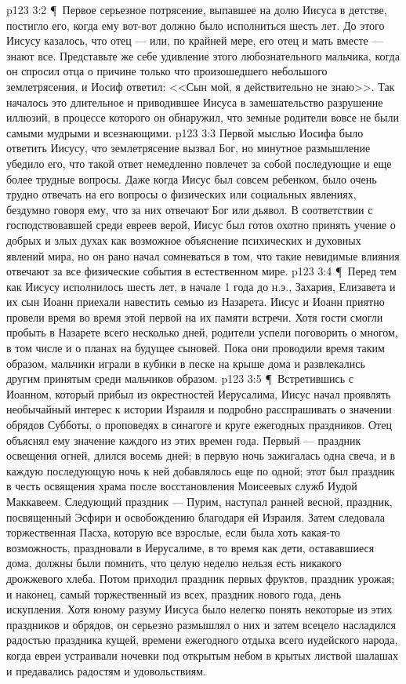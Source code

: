 \vs p123 3:2 \P\ Первое серьезное потрясение, выпавшее на долю Иисуса в детстве, постигло его, когда ему вот\hyp{}вот должно было исполниться шесть лет. До этого Иисусу казалось, что отец --- или, по крайней мере, его отец и мать вместе --- знают все. Представьте же себе удивление этого любознательного мальчика, когда он спросил отца о причине только что произошедшего небольшого землетрясения, и Иосиф ответил: <<Сын мой, я действительно не знаю>>. Так началось это длительное и приводившее Иисуса в замешательство разрушение иллюзий, в процессе которого он обнаружил, что земные родители вовсе не были самыми мудрыми и всезнающими.
\vs p123 3:3 Первой мыслью Иосифа было ответить Иисусу, что землетрясение вызвал Бог, но минутное размышление убедило его, что такой ответ немедленно повлечет за собой последующие и еще более трудные вопросы. Даже когда Иисус был совсем ребенком, было очень трудно отвечать на его вопросы о физических или социальных явлениях, бездумно говоря ему, что за них отвечают Бог или дьявол. В соответствии с господствовавшей среди евреев верой, Иисус был готов охотно принять учение о добрых и злых духах как возможное объяснение психических и духовных явлений мира, но он рано начал сомневаться в том, что такие невидимые влияния отвечают за все физические события в естественном мире.
\vs p123 3:4 \P\ Перед тем как Иисусу исполнилось шесть лет, в начале 1 года до н.э., Захария, Елизавета и их сын Иоанн приехали навестить семью из Назарета. Иисус и Иоанн приятно провели время во время этой первой на их памяти встречи. Хотя гости смогли пробыть в Назарете всего несколько дней, родители успели поговорить о многом, в том числе и о планах на будущее сыновей. Пока они проводили время таким образом, мальчики играли в кубики в песке на крыше дома и развлекались другим принятым среди мальчиков образом.
\vs p123 3:5 \P\ Встретившись с Иоанном, который прибыл из окрестностей Иерусалима, Иисус начал проявлять необычайный интерес к истории Израиля и подробно расспрашивать о значении обрядов Субботы, о проповедях в синагоге и круге ежегодных праздников. Отец объяснял ему значение каждого из этих времен года. Первый --- праздник освещения огней, длился восемь дней; в первую ночь зажигалась одна свеча, и в каждую последующую ночь к ней добавлялось еще по одной; этот был праздник в честь освящения храма после восстановления Моисеевых служб Иудой Маккавеем. Следующий праздник --- Пурим, наступал ранней весной, праздник, посвященный Эсфири и освобождению благодаря ей Израиля. Затем следовала торжественная Пасха, которую все взрослые, если была хоть какая\hyp{}то возможность, праздновали в Иерусалиме, в то время как дети, остававшиеся дома, должны были помнить, что целую неделю нельзя есть никакого дрожжевого хлеба. Потом приходил праздник первых фруктов, праздник урожая; и наконец, самый торжественный из всех, праздник нового года, день искупления. Хотя юному разуму Иисуса было нелегко понять некоторые из этих праздников и обрядов, он серьезно размышлял о них и затем всецело насладился радостью праздника кущей, времени ежегодного отдыха всего иудейского народа, когда евреи устраивали ночевки под открытым небом в крытых листвой шалашах и предавались радостям и удовольствиям.
